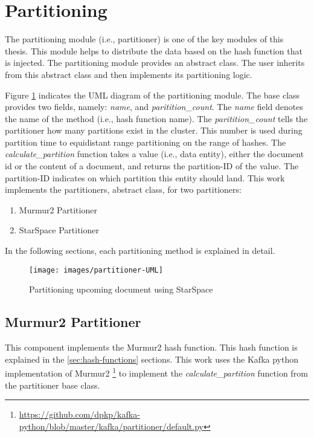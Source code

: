 \section{Partitioning}
\label{sec:partitioning}
The partitioning module (i.e., partitioner) is one of the key modules of this thesis. This module helps to distribute the data based on the hash function that is injected. The partitioning module provides an abstract class. The user inherits from this abstract class and then implements its partitioning logic. 


Figure \ref{fig:partitioner-uml} indicates the UML diagram of the partitioning module. The base class provides two fields, namely: \emph{name}, and \emph{paritition\_count}. The \emph{name} field denotes the name of the method (i.e., hash function name). The \emph{paritition\_count} tells the partitioner how many partitions exist in the cluster. This number is used during partition time to equidistant range partitioning on the range of hashes. The \emph{calculate\_partition} function takes a value (i.e., data entity), either the document id or the content of a document, and returns the partition-ID of the value. The partition-ID indicates on which partition this entity should land. This work implements the partitioners, abstract class, for two partitioners:

\begin{enumerate}
    \item Murmur2 Partitioner
    \item StarSpace Partitioner
\end{enumerate}

In the following sections, each partitioning method is explained in detail.

\begin{figure}[!h]
    \centering
    \texttt{[image: images/partitioner-UML]}
    \caption{Partitioning upcoming document using StarSpace}
    \label{fig:partitioner-uml}
\end{figure}


\subsection{Murmur2 Partitioner}
\label{subsec:partitioning-murmur2}
This component implements the Murmur2 hash function. This hash function is explained in the \ref{sec:hash-functions} sections. This work uses the Kafka python implementation of Murmur2 \footnote{\url{https://github.com/dpkp/kafka-python/blob/master/kafka/partitioner/default.py}} to implement the \emph{calculate\_partition} function from the partitioner base class.

